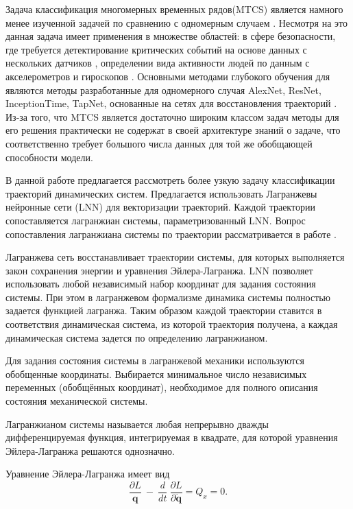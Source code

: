 \documentclass[12pt, twoside]{article}
\begin{document}
Задача классификация многомерных временных рядов(MTCS) является намного менее изученной задачей по сравнению с одномерным случаем \cite{MTCSreview}. Несмотря на это данная задача имеет применения в множестве областей: в сфере безопасности, где требуется детектирование критических событий на основе данных с нескольких датчиков \cite{MTCSindustrial}, определении вида активности людей по данным с акселерометров и гироскопов \cite{MTCSactivity}. Основными методами глубокого обучения для являются методы разработанные для одномерного случая AlexNet, ResNet, InceptionTime, TapNet, основанные на сетях для восстановления траекторий \cite{MTCSreview}. Из-за того, что MTCS является достаточно широким классом задач методы для его решения практически не содержат в своей архитектуре знаний о задаче, что соответственно требует большого числа данных для той же обобщающей способности модели.

В данной работе предлагается рассмотреть более узкую задачу классификации траекторий динамических систем. Предлагается использовать Лагранжевы нейронные сети (LNN) для векторизации траекторий. Каждой траектории сопоставляется лагранжиан системы, параметризованный LNN. Вопрос сопоставления лагранжиана системы по траектории рассматривается  в работе \cite{article}. 

Лагранжева сеть восстанавливает траектории системы, для которых выполняется закон сохранения энергии и уравнения Эйлера-Лагранжа. LNN позволяет использовать любой независимый набор координат для задания состояния системы. При этом в лагранжевом формализме динамика системы полностью задается функцией лагранжа. Таким образом каждой траектории ставится в соответствия динамическая система, из которой траектория получена, а каждая динамическая система задется по определению лагранжианом. 

Для задания состояния системы в лагранжевой механики используются обобщенные координаты.  Выбирается минимальное число независимых переменных (обобщённых координат), необходимое для полного описания состояния механической системы. 

Лагранжианом системы называется любая непрерывно дважды дифференцируемая функция, интегрируемая в квадрате, для которой уравнения Эйлера-Лагранжа решаются однозначно.

Уравнение Эйлера-Лагранжа имеет вид
\begin{equation}
    \frac{\partial L}{\mathbf{q}}\ -\ \frac{d}{dt}\ \frac{\partial L}{\partial\dot{\mathbf{q}}}=Q_x=0.
\end{equation}
\end{document}
